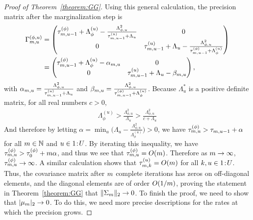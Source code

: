 \begin{proof}[Proof of Theorem~\ref{theorem:GG}]
Using this general calculation, the precision matrix after the marginalization step is 
\begin{align}
 \Gamma^{(\phi, u)}_{m, u} &= \begin{pmatrix}
    \tau_{m, u-1}^{(\phi)} + \Lambda_{\phi}^{(u)} - \frac{\Lambda_{\phi, u}^2}{\tau_{m, u-1}^{(u)} + \Lambda_u} & 0 \\
    0 & \tau_{m, u-1}^{(u)} + \Lambda_u - \frac{\Lambda_{\phi, u}^2}{\tau_{m, u-1}^{(\phi)} + \Lambda^{(u)}_{\phi}}
   \end{pmatrix} \nonumber \\
   &= \begin{pmatrix}
    \tau_{m, u-1}^{(\phi)} + \Lambda_{\phi}^{(u)} - \alpha_{m, u} & 0 \\
    0 & \tau_{m, u-1}^{(u)} + \Lambda_u - \beta_{m, u}
   \end{pmatrix},\label{eq:margPrecision}
\end{align}
with $\alpha_{m, u} = \frac{\Lambda_{\phi, u}^2}{\tau_{m, u-1}^{(u)} + \Lambda_u}$ and $\beta_{m, u} = \frac{\Lambda_{\phi, u}^2}{\tau_{m, u-1}^{(\phi)} + \Lambda^{(u)}_{\phi}}$. Because $\Lambda^*_u$ is a positive definite matrix, for all real numbers $c > 0$, 
\begin{align*}
    \Lambda_{\phi}^{(u)} > \frac{\Lambda^2_{\phi, u}}{\Lambda_{u}} > \frac{\Lambda^2_{\phi, u}}{c + \Lambda_{u}} 
  \end{align*}
And therefore by letting $\alpha = \min_u \big(\Lambda_u - \frac{\Lambda^2_{\phi, u}}{\Lambda^{(u)}_{\phi}}\big) > 0$, we have $\tau_{m, u}^{(\phi)} > \tau_{m, u-1} + \alpha$ for all $m \in \mathbb{N}$ and $u \in {1}\!:\!{U}$. 
By iterating this inequality, we have $\tau_{m, u}^{(\phi)} > \tau^{(\phi)}_0 + m\alpha$, and thus we see that $\tau_{m, u}^{(\phi)} = O(m)$. 
Therefore as $m \rightarrow \infty$, $\tau_{m, u}^{(\phi)} \rightarrow \infty$. 
A similar calculation shows that $\tau_{m, k}^{(u)} = O(m)$ for all $k, u \in {1}\!:\!{U}$. 
Thus, the covariance matrix after $m$ complete iterations has zeros on off-diagonal elements, and the diagonal elements are of order $O(1/m)$, proving the statement in Theorem~\ref{theorem:GG} that $\|\Sigma_m\|_2 \rightarrow 0$. 
To finish the proof, we need to show that $|\mu_m|_2 \rightarrow 0$. 
To do this, we need more precise descriptions for the rates at which the precision grows. 


\end{proof}
